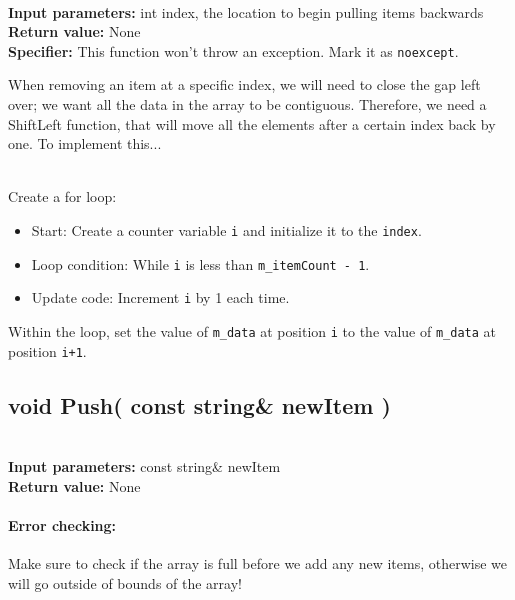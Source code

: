 \documentclass[a4paper,12pt]{book}
\begin{document}
    \begin{framed} ~\\
        \textbf{Input parameters:} int index, the location to begin pulling items backwards \\
        \textbf{Return value:} None \\
        \textbf{Specifier:} This function won't throw an exception. Mark it as \texttt{noexcept}.
    \end{framed}

    When removing an item at a specific index, we will need to close the
    gap left over; we want all the data in the array to be contiguous.
    Therefore, we need a ShiftLeft function, that will move all the elements
    after a certain index back by one. To implement this...
    
    ~\\
    Create a for loop:
    \begin{itemize}
        \item Start: Create a counter variable \texttt{i} and initialize it to the \texttt{index}.
        \item Loop condition: While \texttt{i} is less than \texttt{m\_itemCount - 1}.
        \item Update code: Increment \texttt{i} by 1 each time.
    \end{itemize}

    Within the loop, set the value of \texttt{m\_data} at position \texttt{i}
    to the value of \texttt{m\_data} at position \texttt{i+1}.
    
    \hrulefill
    \subsection*{void Push( const string\& newItem )}

    \begin{framed} ~\\
        \textbf{Input parameters:} const string\& newItem \\
        \textbf{Return value:} None
    \end{framed}

    \paragraph{Error checking:} Make sure to check if the array is full
    before we add any new items, otherwise we will go outside of bounds of the array!
\end{document}
